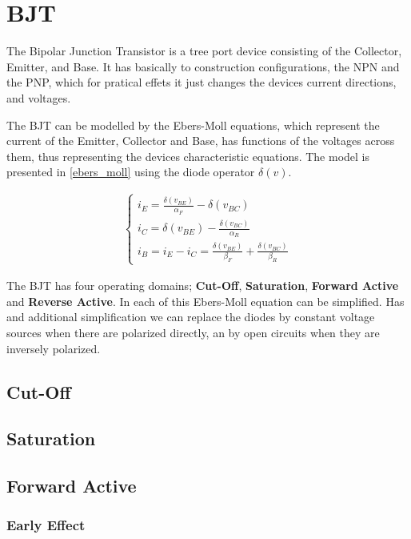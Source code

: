 \documentclass[a4paper]{report}
\begin{document}
\section{BJT}
The Bipolar Junction Transistor is a tree port device consisting of the Collector, Emitter, and Base. It has basically to construction configurations, the NPN and the PNP, which for pratical effets it just changes the devices current directions, and voltages.





The BJT can be modelled by the Ebers-Moll equations, which represent the current of the Emitter, Collector and Base, has functions of the voltages across them, thus representing the devices characteristic equations. The model is presented in \ref{ebers_moll} using the diode operator $\delta(v)$.


\begin{eqnarray} \label{ebers-moll}
\begin{cases}i_E=\frac{\delta(v_{BE})}{\alpha_F}  -\delta(v_{BC})\\ 
i_C=\delta(v_{BE})-\frac{\delta(v_{BC})}{\alpha_R} \\ 
i_B=i_E-i_C=\frac{\delta(v_{BE})}{\beta_F} + \frac{\delta(v_{BC})}{\beta_R}\end{cases} 
\end{eqnarray}

The BJT has four operating domains; \textbf{Cut-Off}, \textbf{Saturation}, \textbf{Forward Active} and \textbf{Reverse Active}. In each of this Ebers-Moll equation can be simplified. Has and additional simplification we can replace the diodes by constant voltage sources when there are polarized directly, an by open circuits when they are inversely polarized.


 
\subsection{Cut-Off}

\subsection{Saturation}

\subsection{Forward Active}

\subsubsection{Early Effect}
\end{document}
